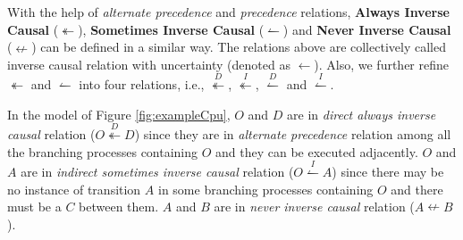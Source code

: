 \documentclass{llncs}
\begin{document}
With the help of \textit{alternate precedence} and \textit{precedence} relations, \textbf{Always Inverse Causal} ($\twoheadleftarrow$), \textbf{Sometimes Inverse Causal} ($\leftharpoonup$) and \textbf{Never Inverse Causal} ($\nleftarrow$) can be defined in a similar way. The relations above are collectively called inverse causal relation with uncertainty (denoted as $\leftarrow$). Also, we further refine $\twoheadleftarrow$ and $\leftharpoonup$ into four relations, i.e., $\overset{D}{\twoheadleftarrow}$, $\overset{I}{\twoheadleftarrow}$, $\overset{D}{\leftharpoonup}$ and $\overset{I}{\leftharpoonup}$.




\begin{example}
In the model of Figure \ref{fig:exampleCpu}, $O$ and $D$ are in \textit{direct always inverse causal} relation ($O\overset{D}{\twoheadleftarrow}D$) since they are in \textit{alternate precedence} relation among all the branching processes containing $O$ and they can be executed adjacently. $O$ and $A$ are in \textit{indirect sometimes inverse causal} relation ($O\overset{I}{\leftharpoonup}A$) since there may be no instance of transition $A$ in some branching processes containing $O$ and there must be a $C$ between them. $A$ and $B$ are in \textit{never inverse causal} relation ($A\nleftarrow B$).
\end{example}
\end{document}
